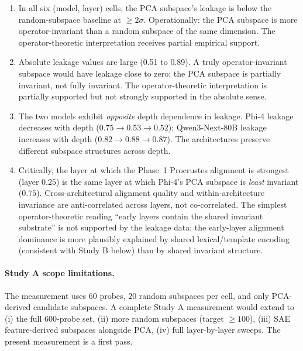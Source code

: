 \begin{enumerate}
    \item In all six (model, layer) cells, the PCA subspace's leakage
        is below the random-subspace baseline at $\geq 2\sigma$.
        Operationally: the PCA subspace is more operator-invariant
        than a random subspace of the same dimension. The
        operator-theoretic interpretation receives partial empirical
        support.
    \item Absolute leakage values are large (0.51 to 0.89). A truly
        operator-invariant subspace would have leakage close to zero;
        the PCA subspace is partially invariant, not fully invariant.
        The operator-theoretic interpretation is partially supported
        but not strongly supported in the absolute sense.
    \item The two models exhibit \emph{opposite} depth dependence in
        leakage. Phi-4 leakage decreases with depth ($0.75 \to 0.53
        \to 0.52$); Qwen3-Next-80B leakage increases with depth
        ($0.82 \to 0.88 \to 0.87$). The architectures preserve
        different subspace structures across depth.
    \item Critically, the layer at which the Phase~1 Procrustes
        alignment is strongest (layer $0.25$) is the same layer at
        which Phi-4's PCA subspace is \emph{least} invariant ($0.75$).
        Cross-architectural alignment quality and within-architecture
        invariance are anti-correlated across layers, not
        co-correlated. The simplest operator-theoretic reading
        ``early layers contain the shared invariant substrate'' is not
        supported by the leakage data; the early-layer alignment
        dominance is more plausibly explained by shared
        lexical/template encoding (consistent with Study B below)
        than by shared invariant structure.
\end{enumerate}

\paragraph{Study A scope limitations.} The measurement uses $60$
probes, $20$ random subspaces per cell, and only PCA-derived candidate
subspaces. A complete Study A measurement would extend to (i) the full
$600$-probe set, (ii) more random subspaces (target $\geq 100$),
(iii) SAE feature-derived subspaces alongside PCA, (iv) full
layer-by-layer sweeps. The present measurement is a first pass.

